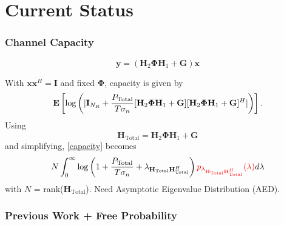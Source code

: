 \documentclass[10pt,tgadventor, onlymath]{beamer}
\begin{document}
\section{Current Status}


\begin{frame}
\frametitle{Channel Capacity}
\begin{equation*}
	\mathbf{y} = (\mathbf{H}_2\boldsymbol{\Phi}\mathbf{H}_1 + \mathbf{G})\mathbf{x}
\end{equation*}

With $\mathbf{x}\mathbf{x}^H = \mathbf{I}$ and fixed $\boldsymbol{\Phi}$, capacity is given by 
\begin{equation}\label{capacity}
\mathop{\bf E{}}\left[\text{log{}}\left(|\mathbf{I}_{N_R}+\frac{P_{\text{Total}}}{T \sigma_n}[\mathbf{H}_{2}\boldsymbol{\Phi}\mathbf{H}_{1} + \mathbf{G}][\mathbf{H}_{2}\boldsymbol{\Phi}\mathbf{H}_{1} + \mathbf{G}]^H|\right)\right].
\end{equation}
Using 
\begin{equation}
\mathbf{H}_{\text{Total}} = \mathbf{H}_{2}\boldsymbol{\Phi}\mathbf{H}_{1} + \mathbf{G}
\end{equation}
and simplifying, \ref{capacity} becomes
\begin{equation}
N \int_0^{\infty}\text{log{}}\left(1+\frac{P_{\text{Total}}}{T \sigma_n} + \lambda_{\mathbf{H}_{\text{Total}}\mathbf{H}_{\text{Total}}^H}\right) \textcolor{red}{p_{\lambda_{\mathbf{H}_{\text{Total}}\mathbf{H}_{\text{Total}}^H}}(\lambda)} d\lambda
\end{equation}
with $N$ = rank($\mathbf{H}_{\text{Total}}$).
Need Asymptotic Eigenvalue Distribution (AED).
\end{frame}


\subsubsection{Previous Work + Free Probability}
\end{document}
